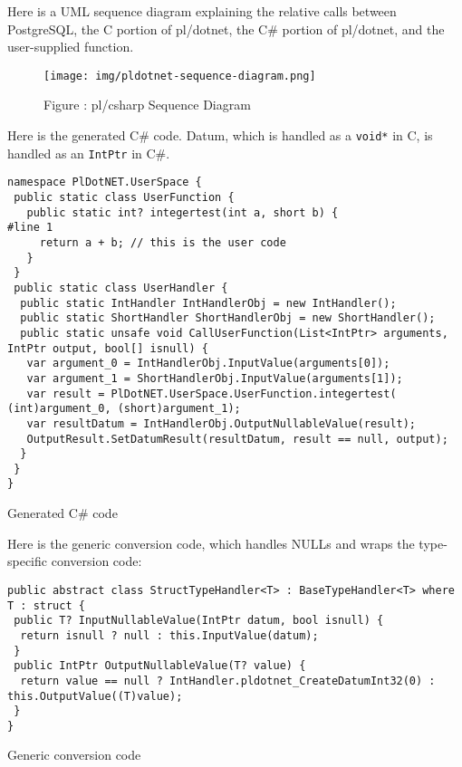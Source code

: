 \documentclass[sigconf,techreport,authorversion,nonacm]{acmart}
\begin{document}
Here is a UML sequence diagram explaining the relative calls
between PostgreSQL, the C portion of pl/dotnet, the C\# portion
of pl/dotnet, and the user-supplied function.

\begin{figure*}
        \texttt{[image: img/pldotnet-sequence-diagram.png]}
        \caption{Figure \thefigure: pl/csharp Sequence Diagram}
\end{figure*}

Here is the generated C\# code.  Datum, which is handled as a
\texttt{void*} in C, is handled as an \texttt{IntPtr} in C\#.

\begin{listing}[H]
\begin{verbatim}
namespace PlDotNET.UserSpace {
 public static class UserFunction {
   public static int? integertest(int a, short b) {
#line 1
     return a + b; // this is the user code
   }
 }
 public static class UserHandler {
  public static IntHandler IntHandlerObj = new IntHandler();
  public static ShortHandler ShortHandlerObj = new ShortHandler();
  public static unsafe void CallUserFunction(List<IntPtr> arguments, IntPtr output, bool[] isnull) {
   var argument_0 = IntHandlerObj.InputValue(arguments[0]);
   var argument_1 = ShortHandlerObj.InputValue(arguments[1]);
   var result = PlDotNET.UserSpace.UserFunction.integertest( (int)argument_0, (short)argument_1);
   var resultDatum = IntHandlerObj.OutputNullableValue(result);
   OutputResult.SetDatumResult(resultDatum, result == null, output);
  }
 }
}
\end{verbatim}
\caption{Generated C\# code}
\end{listing}


Here is the generic conversion code, which handles NULLs and wraps the
type-specific conversion code:

\begin{listing}[H]
\begin{verbatim}
public abstract class StructTypeHandler<T> : BaseTypeHandler<T> where T : struct {
 public T? InputNullableValue(IntPtr datum, bool isnull) {
  return isnull ? null : this.InputValue(datum);
 }
 public IntPtr OutputNullableValue(T? value) {
  return value == null ? IntHandler.pldotnet_CreateDatumInt32(0) : this.OutputValue((T)value);
 }
}
\end{verbatim}
\caption{Generic conversion code}
\end{listing}
\end{document}

